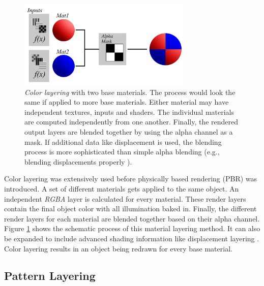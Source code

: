 	\begin{figure}
		\centering
		\includegraphics[width=0.75\textwidth]{images/03cha_03_ColorLayering.jpg}
		\caption[Color Layering]{
			\emph{Color layering} with two base materials. The process would look the same if applied to more base materials. Either material may have independent textures, inputs and shaders. The individual materials are computed independently from one another. Finally, the rendered output layers are blended together by using the alpha channel as a mask. If additional data like displacement is used, the blending process is more sophisticated than simple alpha blending (e.g., blending displacements properly \cite{pesare2017material}).}
		\label{fig:ColorLayering}
	\end{figure}
	
	
	 Color layering was extensively used before physically based rendering (PBR) was introduced. A set of different materials gets applied to the same object. An independent \emph{RGBA} layer is calculated for every material. These render layers contain the final object color with all illumination baked in. Finally, the different render layers for each material are blended together based on their alpha channel. Figure \ref{fig:ColorLayering} shows the schematic process of this material layering method. It can also be expanded to include advanced shading information like displacement layering \cite{pesare2017material}. Color layering results in an object being redrawn for every base material.
	

	\subsection{Pattern Layering}\label{sec:patternLayering}
		
